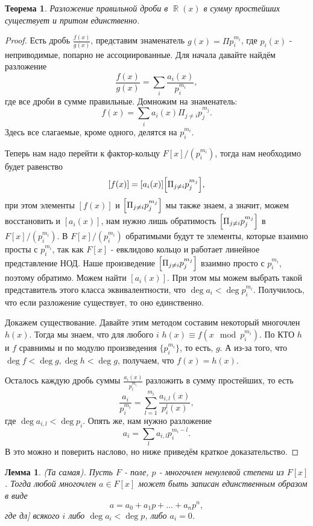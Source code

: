 \documentclass[a4paper,100pt]{article}
\theoremstyle{indented}
\newtheorem{theorem}{Теорема}
\newtheorem{lemma}{Лемма}
\theoremstyle{definition}
\theoremstyle{remark}
\DeclareMathOperator{\RR}{\mathbb{R}}
\begin{document}
\begin{theorem}
    Разложение правильной дроби в $\RR(x)$ в сумму простейших существует и притом единственно.
\end{theorem}

\begin{proof}
    Есть дробь $\frac{f(x)}{g(x)}$, представим знаменатель $g(x)=\Pi p_i^{m_i}$, где $p_i(x)$ - неприводимые, попарно не ассоциированные. Для начала давайте найдём разложение
    \[
        \frac{f(x)}{g(x)}=\sum_i\frac{a_i(x)}{p_i^{m_i}}, 
    \]
    где все дроби в сумме правильные. Домножим на знаменатель:
    \[
        f(x)=\sum_i a_i(x)\Pi_{j\neq i}p_j^{m_j}.
    \]
    Здесь все слагаемые, кроме одного, делятся на $p_i^{m_i}$.\ 

    Теперь нам надо перейти к фактор-кольцу $F[x]/(p_i^{m_i})$, тогда нам необходимо будет равенство
    \[
        [f(x)]=[a_i(x)]\Bigl[\Pi_{j\neq i}p_j^{m_j}\Bigr], 
    \]
    при этом элементы $[f(x)]$ и $\Bigl[\Pi_{j\neq i}p_j^{m_j}\Bigr]$ мы также знаем, а значит, можем восстановить и $[a_i(x)]$, нам нужно лишь обратимость $\Bigl[\Pi_{j\neq i}p_j^{m_j}\Bigr]$ в $F[x]/(p_i^{m_i})$. В $F[x]/(p_i^{m_i})$ обратимыми будут те элементы, которые взаимно просты с $p_i^{m_i}$, так как $F[x]$ - евклидово кольцо и работает линейное представление НОД. Наше произведение $\Bigl[\Pi_{j\neq i}p_j^{m_j}\Bigr]$ взаимно просто с $p_i^{m_i}$, поэтому обратимо. Можем найти $[a_i(x)]$. При этом мы можем выбрать такой представитель этого класса эквивалентности, что $\deg a_i<\deg p_i^{m_i}$. Получилось, что если разложение существует, то оно единственно.\ 

    Докажем существование. Давайте этим методом составим некоторый многочлен $h(x)$. Тогда мы знаем, что для любого $i$ $h(x)\equiv f(x \mod p_i^{m_i})$. По КТО $h$ и $f$ сравнимы и по модулю произведения $\{p_i^{m_i}\}$, то есть, $g$. А из-за того, что $\deg f< \deg g, \deg h<\deg g$, получаем, что $f(x)=h(x)$. \

    Осталось каждую дробь суммы $\frac{a_i(x)}{p_i^{m_i}}$ разложить в сумму простейших, то есть
    \[
        \frac{a_i}{p_i^{m_i}}=\sum_{l=1}^{m_i}\frac{a_{i,l}(x)}{p_i^l(x)}, 
    \]
    где $\deg a_{i,l}<\deg p_i$. Опять же, нам нужно разложение
    \[
        a_i=\sum_l a_{i, l}p_i^{m_i-l}.
    \]
    В это можно и поверить наслово, но ниже приведём краткое доказательство.
\end{proof}

\begin{lemma}
    (Та самая). Пусть $F$ - поле, $p$ - многочлен ненулевой степени из $F[x]$. Тогда любой многочлен $a\in F[x]$ может быть записан единственным образом в виде 
    \[
        a=a_0+a_1 p+\dots+a_n p^n,
    \]
    где дл] всякого $i$ либо $\deg a_i<\deg p$, либо $a_i=0$.
\end{lemma}
\end{document}
